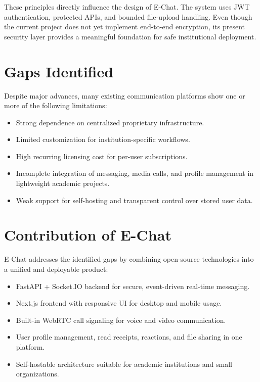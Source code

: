 \documentclass[12pt,a4paper,oneside]{report}
\begin{document}
These principles directly influence the design of E-Chat. The system uses JWT
authentication, protected APIs, and bounded file-upload handling. Even though the
current project does not yet implement end-to-end encryption, its present security
layer provides a meaningful foundation for safe institutional deployment.

\section{Gaps Identified}
\label{sec:gaps-identified}

Despite major advances, many existing communication platforms show one or more
of the following limitations:
\begin{itemize}
  \item Strong dependence on centralized proprietary infrastructure.
  \item Limited customization for institution-specific workflows.
  \item High recurring licensing cost for per-user subscriptions.
  \item Incomplete integration of messaging, media calls, and profile management in lightweight academic projects.
  \item Weak support for self-hosting and transparent control over stored user data.
\end{itemize}

\section{Contribution of E-Chat}
\label{sec:echat-contribution}

E-Chat addresses the identified gaps by combining open-source technologies into
a unified and deployable product:
\begin{itemize}
  \item FastAPI + Socket.IO backend for secure, event-driven real-time messaging.
  \item Next.js frontend with responsive UI for desktop and mobile usage.
  \item Built-in WebRTC call signaling for voice and video communication.
  \item User profile management, read receipts, reactions, and file sharing in one platform.
  \item Self-hostable architecture suitable for academic institutions and small organizations.
\end{itemize}
\end{document}
